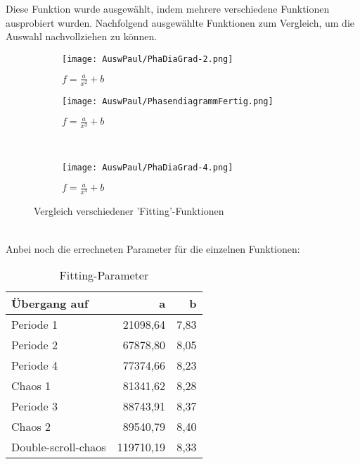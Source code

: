 Diese Funktion wurde ausgewählt, indem mehrere verschiedene Funktionen ausprobiert wurden. Nachfolgend ausgewählte Funktionen zum Vergleich, um die Auswahl nachvollziehen zu können.
\begin{figure}[h]

    \centering
    
    \begin{subfigure}[b]{0.45\textwidth}
        \centering
        \texttt{[image: AuswPaul/PhaDiaGrad-2.png]}
        \caption{$f = \frac{a}{x^2} + b$}
    \end{subfigure}
    \hfill
    \begin{subfigure}[b]{0.45\textwidth}
        \centering
        \texttt{[image: AuswPaul/PhasendiagrammFertig.png]}
        \caption{$f = \frac{a}{x^3} + b$}
    \end{subfigure}
    \\
    \begin{subfigure}[b]{0.45\textwidth}
        \centering
        \texttt{[image: AuswPaul/PhaDiaGrad-4.png]}
        \caption{$f = \frac{a}{x^4} + b$}
    \end{subfigure}
    \caption{Vergleich verschiedener 'Fitting'-Funktionen}
    \label{fig:PhasenDiaVergl}
    \end{figure}\\
\newpage
Anbei noch die errechneten Parameter für die einzelnen Funktionen: \\
\begin{table}[h]
    \centering
    \begin{tabular}{l|r|r}
            Übergang auf &          a &     b \\
            \hline
               Periode 1 &   21098,64 &  7,83 \\
               Periode 2 &   67878,80 &  8,05 \\
               Periode 4 &   77374,66 &  8,23 \\
                 Chaos 1 &   81341,62 &  8,28 \\
               Periode 3 &   88743,91 &  8,37 \\
                 Chaos 2 &   89540,79 &  8,40 \\
     Double-scroll-chaos &  119710,19 &  8,33 \\
    \end{tabular}
    \caption{Fitting-Parameter}
\end{table}




